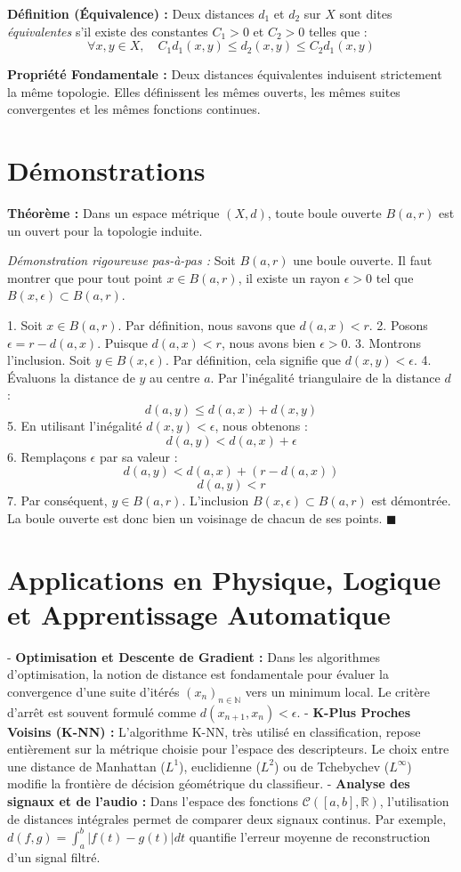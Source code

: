 \documentclass[11pt,a4paper]{article}
\begin{document}
\textbf{Définition (Équivalence) :}
Deux distances $d_1$ et $d_2$ sur $X$ sont dites \textit{équivalentes} s'il existe des constantes $C_1 > 0$ et $C_2 > 0$ telles que :
$$ \forall x, y \in X, \quad C_1 d_1(x, y) \le d_2(x, y) \le C_2 d_1(x, y) $$

\textbf{Propriété Fondamentale :}
Deux distances équivalentes induisent strictement la même topologie. Elles définissent les mêmes ouverts, les mêmes suites convergentes et les mêmes fonctions continues.

\section{Démonstrations}

\textbf{Théorème :} Dans un espace métrique $(X, d)$, toute boule ouverte $B(a, r)$ est un ouvert pour la topologie induite.

\textit{Démonstration rigoureuse pas-à-pas :}
Soit $B(a, r)$ une boule ouverte. Il faut montrer que pour tout point $x \in B(a, r)$, il existe un rayon $\epsilon > 0$ tel que $B(x, \epsilon) \subset B(a, r)$.

1. Soit $x \in B(a, r)$. Par définition, nous savons que $d(a, x) < r$.
2. Posons $\epsilon = r - d(a, x)$. Puisque $d(a, x) < r$, nous avons bien $\epsilon > 0$.
3. Montrons l'inclusion. Soit $y \in B(x, \epsilon)$. Par définition, cela signifie que $d(x, y) < \epsilon$.
4. Évaluons la distance de $y$ au centre $a$. Par l'inégalité triangulaire de la distance $d$ :
   $$ d(a, y) \le d(a, x) + d(x, y) $$
5. En utilisant l'inégalité $d(x, y) < \epsilon$, nous obtenons :
   $$ d(a, y) < d(a, x) + \epsilon $$
6. Remplaçons $\epsilon$ par sa valeur :
   $$ d(a, y) < d(a, x) + (r - d(a, x)) $$
   $$ d(a, y) < r $$
7. Par conséquent, $y \in B(a, r)$. L'inclusion $B(x, \epsilon) \subset B(a, r)$ est démontrée. La boule ouverte est donc bien un voisinage de chacun de ses points. \hfill $\blacksquare$

\section{Applications en Physique, Logique et Apprentissage Automatique}

- \textbf{Optimisation et Descente de Gradient :} Dans les algorithmes d'optimisation, la notion de distance est fondamentale pour évaluer la convergence d'une suite d'itérés $(x_n)_{n \in \mathbb{N}}$ vers un minimum local. Le critère d'arrêt est souvent formulé comme $d(x_{n+1}, x_n) < \epsilon$.
- \textbf{K-Plus Proches Voisins (K-NN) :} L'algorithme K-NN, très utilisé en classification, repose entièrement sur la métrique choisie pour l'espace des descripteurs. Le choix entre une distance de Manhattan ($L^1$), euclidienne ($L^2$) ou de Tchebychev ($L^\infty$) modifie la frontière de décision géométrique du classifieur.
- \textbf{Analyse des signaux et de l'audio :} Dans l'espace des fonctions $\mathcal{C}([a,b], \mathbb{R})$, l'utilisation de distances intégrales permet de comparer deux signaux continus. Par exemple, $d(f, g) = \int_a^b |f(t) - g(t)| dt$ quantifie l'erreur moyenne de reconstruction d'un signal filtré.
\end{document}
